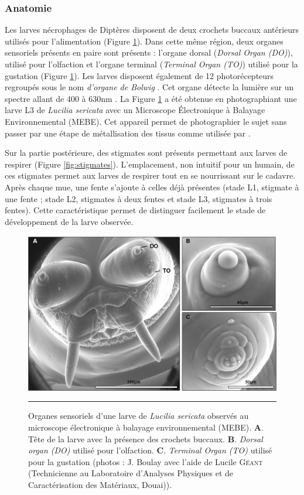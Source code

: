     
    \subsubsection{Anatomie}
		\label{subsubsec:anatomie}
Les larves nécrophages de Diptères disposent de deux crochets buccaux antérieurs utilisés pour l'alimentation (Figure \ref{fig:organes}). Dans cette même région, deux organes sensoriels présents en paire sont présents : l'organe dorsal (\textit{Dorsal Organ (DO)}), utilisé pour l'olfaction \cite{chu-wang_fine_1971-1} et l'organe terminal (\textit{Terminal Organ (TO)}) utilisé pour la gustation \cite{chu-wang_fine_1971} (Figure \ref{fig:organes}). Les larves disposent également de 12 photorécepteurs regroupés sous le nom \textit{d'organe de Bolwig} \cite{hinnemann_see_2010}. Cet organe détecte la lumière sur un spectre allant de 400 à 630nm \cite{hinnemann_see_2010}. La Figure \ref{fig:organes} a été obtenue en photographiant une larve L3 de \textit{Lucilia sericata} avec un Microscope Électronique à Balayage Environnemental (MEBE). Cet appareil permet de photographier le sujet sans passer par une étape de métallisation des tissus comme utilisée par \citet{colwell_preparation_1986}.  

Sur la partie postérieure, des stigmates sont présents permettant aux larves de respirer (Figure \ref{fig:stigmates}). L'emplacement, non intuitif pour un humain, de ces stigmates permet aux larves de respirer tout en se nourrissant sur le cadavre. Après chaque mue, une fente s'ajoute à celles déjà présentes (stade L1, stigmate à une fente ; stade L2, stigmates à deux fentes et stade L3, stigmates à trois fentes). Cette caractéristique permet de distinguer facilement le stade de développement de la larve observée.

\begin{figure}[p]
\centering
		\includegraphics[width=0.9 \textwidth]{Figures/organes.png}
		\rule{35em}{0.5pt}
		\caption[Organes]{Organes sensoriels d'une larve de \textit{Lucilia sericata} observés au microscope électronique à balayage environnemental (MEBE). \textbf{A}. Tête de la larve avec la présence des crochets buccaux. \textbf{B}. \textit{Dorsal organ (DO)} utilisé pour l'olfaction. \textbf{C}. \textit{Terminal Organ (TO)} utilisé pour la gustation (photos : J. Boulay avec l'aide de Lucile \textsc{Géant} (Technicienne au Laboratoire d'Analyses Physiques et de Caractérisation des Matériaux, Douai)).}
	\label{fig:organes}
\end{figure}

